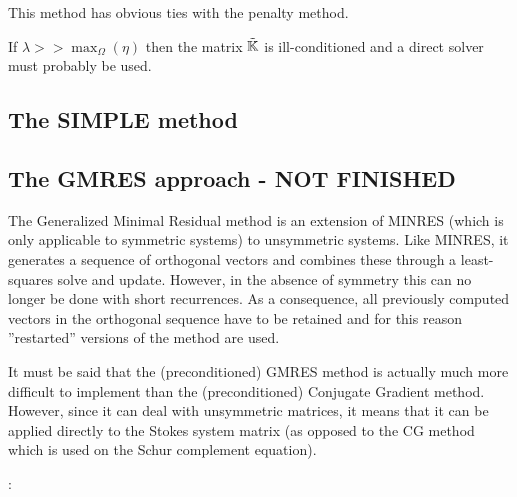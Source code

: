 \begin{remark} 
This method has obvious ties with the penalty method. 
\end{remark}

\begin{remark} 
If $\lambda >> \max_\Omega(\eta)$ then the matrix $\tilde{{\mathbb{K}}}$ is ill-conditioned and 
a direct solver must probably be used.
\end{remark}

\newpage
\subsection{The SIMPLE method}







\newpage
\subsection{The GMRES approach - NOT FINISHED}

The Generalized Minimal Residual method \cite{sasc86} 
is an extension of MINRES (which is only applicable to symmetric systems) 
to unsymmetric systems. 
Like MINRES, it generates a sequence of orthogonal vectors and 
combines these through a least-squares solve and update. However, 
in the absence of symmetry this can no longer be done with short recurrences. As a consequence, 
all previously computed vectors in the orthogonal sequence have to be retained and 
for this reason ''restarted'' versions of the method are used.

It must be said that the (preconditioned) GMRES method is actually 
much more difficult to implement 
than the (preconditioned) Conjugate Gradient method.
However, since it can deal with unsymmetric matrices, it means that it can be applied 
directly to the Stokes system matrix (as opposed to the CG method which 
is used on the Schur complement equation).

 

\Literature: \cite[p208]{eijkhout} \cite{saad,saad93} \cite{babc94} \cite{ayac03}


